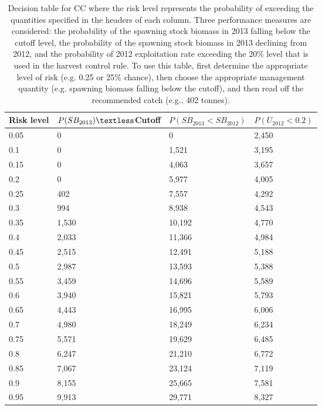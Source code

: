%
\begin{table}[!tbp]
 \caption{Decision table for CC where the risk 
			level represents the probability of exceeding the quantities specified
			in the headers of each column.  Three performance measures are considered:
			the probability of the spawning stock biomass in 2013 falling below the cutoff
			level,  the probability of the spawning stock biomass in 2013 declining from 2012, 
			and the probability of 2012 exploitation rate exceeding the 20\% level that is
			used in the harvest control rule. To use this table, first determine the 
			appropriate level of risk (e.g. 0.25 or 25\% chance),  then choose the appropriate
			management quantity (e.g. spawning biomass falling below the cutoff), and then read
			off the recommended catch (e.g.,   402 tonnes).\label{Table:RiskCC}} 
 \begin{center}
 \begin{tabular}{llll}\hline\hline
\multicolumn{1}{c}{Risk level}&\multicolumn{1}{c}{$P(SB_{2013})\textless$Cutoff}&\multicolumn{1}{c}{$P(SB_{2013}<SB_{2012})$}&\multicolumn{1}{c}{$P(U_{2012}<0.2)$}\tabularnewline
\hline
0.05&    0&     0&2,450\tabularnewline
0.1&    0& 1,521&3,195\tabularnewline
0.15&    0& 4,063&3,657\tabularnewline
0.2&    0& 5,977&4,005\tabularnewline
0.25&  402& 7,557&4,292\tabularnewline
0.3&  994& 8,938&4,543\tabularnewline
0.35&1,530&10,192&4,770\tabularnewline
0.4&2,033&11,366&4,984\tabularnewline
0.45&2,515&12,491&5,188\tabularnewline
0.5&2,987&13,593&5,388\tabularnewline
0.55&3,459&14,696&5,589\tabularnewline
0.6&3,940&15,821&5,793\tabularnewline
0.65&4,443&16,995&6,006\tabularnewline
0.7&4,980&18,249&6,234\tabularnewline
0.75&5,571&19,629&6,485\tabularnewline
0.8&6,247&21,210&6,772\tabularnewline
0.85&7,067&23,124&7,119\tabularnewline
0.9&8,155&25,665&7,581\tabularnewline
0.95&9,913&29,771&8,327\tabularnewline
\hline
\end{tabular}

\end{center}

\end{table}

